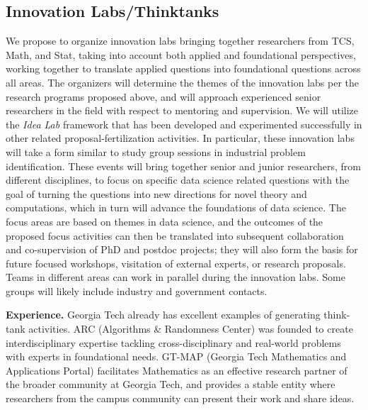 \documentclass[12pt]{article}
\begin{document}
\subsection{Innovation Labs/Thinktanks}
\label{sec:idea-labs}
We propose to organize innovation labs bringing together researchers from TCS, Math, and Stat, taking into account both applied and foundational perspectives, working together to translate applied questions into foundational questions across all areas.
The organizers will determine the themes of the innovation labs per the research programs proposed above, and will approach experienced senior researchers in the field with respect to mentoring and supervision.
We will utilize the {\em Idea Lab} framework that has been developed and experimented successfully in other related proposal-fertilization activities.
In particular, these innovation labs will take a form similar to study group sessions in industrial problem identification. These events will bring together senior and junior researchers, from different disciplines, to focus on specific data science related questions with the goal of turning the questions into new directions for novel theory and computations, which in turn will advance the foundations of data science.
The focus areas are based on themes in data science, and the outcomes of the proposed focus activities can then be translated into subsequent collaboration and co-supervision of  PhD and postdoc projects; they will also form the basis for future focused workshops, visitation of external experts, or research proposals.
Teams in different areas can work in parallel during the innovation labs. Some groups will likely include industry and government contacts.

\medskip

\noindent
{\bf Experience.}
Georgia Tech already has excellent examples of generating think-tank activities.
ARC (Algorithms \& Randomness Center) was founded to create interdisciplinary expertise tackling cross-disciplinary and real-world problems with experts in foundational needs.
GT-MAP (Georgia Tech Mathematics and Applications Portal) facilitates Mathematics as an effective research partner of the broader community at Georgia Tech, and provides a stable entity where researchers from the campus community can present their work and share ideas.
\end{document}
